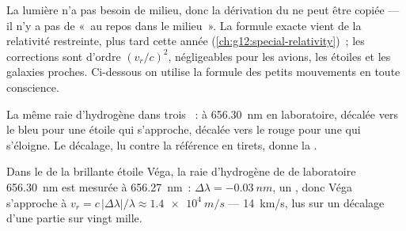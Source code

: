 \begin{remark}\label{rem:g12:doppler-effect:honest}
La lumière n'a pas besoin de milieu, donc la dérivation du
 ne peut être copiée --- il n'y a pas de «~au repos dans le
milieu~». La formule exacte vient de la relativité restreinte, plus
tard cette année (\cref{ch:g12:special-relativity})~; les corrections
sont d'ordre $(v_r/c)^2$, négligeables pour les avions, les étoiles
et les galaxies proches. Ci-dessous on utilise la formule des petits
mouvements en toute conscience.
\end{remark}

\begin{omfigure}

{\small La même raie d'hydrogène dans trois ~: à
\qty{656.30}{nm} en laboratoire, décalée vers le bleu pour une
étoile qui s'approche, décalée vers le rouge pour une qui
s'éloigne. Le décalage, lu contre la référence en tirets, donne la
.}
\end{omfigure}

\begin{example}\label{ex:g12:doppler-effect:vega}
Dans le  de la brillante étoile Véga, la raie
d'hydrogène de  de laboratoire
\qty{656.30}{nm} est mesurée à \qty{656.27}{nm}~:
$\Delta\lambda = \qty{-0.03}{nm}$, un ,
donc Véga s'approche à
$v_r = c\,|\Delta\lambda|/\lambda \approx \qty{1.4e4}{m/s}$ ---
\qty{14}{km/s}, lus sur un décalage d'une partie sur vingt mille.
\end{example}

